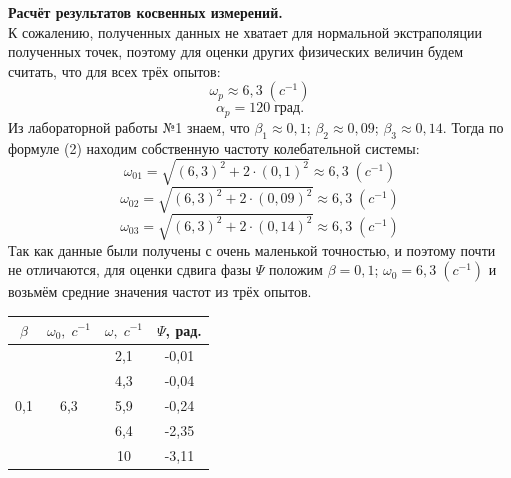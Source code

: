 \documentclass[a4paper]{article}
\begin{document}
{\parindent=0pt\textbf{Расчёт результатов косвенных измерений.}}\\
К сожалению, полученных данных не хватает для нормальной экстраполяции полученных точек, поэтому для оценки других физических величин будем считать, что для всех трёх опытов:
$$\omega_{p}\approx6,3\;(c^{-1})$$
$$\alpha_{p}=120\;\mbox{град.}$$
Из лабораторной работы №1 знаем, что $\beta_1 \approx 0,1$; $\beta_2 \approx 0,09$; $\beta_3 \approx 0,14$. Тогда по формуле (2) находим собственную частоту колебательной системы:
$$ \omega_{01}=\sqrt{(6,3)^2+2\cdot(0,1)^2}\approx6,3\;(c^{-1})$$
$$ \omega_{02}=\sqrt{(6,3)^2+2\cdot(0,09)^2}\approx6,3\;(c^{-1})$$
$$ \omega_{03}=\sqrt{(6,3)^2+2\cdot(0,14)^2}\approx6,3\;(c^{-1})$$
Так как данные были получены с очень маленькой точностью, и поэтому почти не отличаются, для оценки сдвига фазы $\Psi$ положим $\beta=0,1$; $\omega_0=6,3\;(c^{-1})$ и возьмём средние значения  частот из трёх опытов.

	\begin{center}
	\begin{tabular}{|c|c|c|c|}
	\hline
	$\beta$&$\omega_0,\;c^{-1}$&$\omega,\;c^{-1}$&$\Psi$, рад.  \\
			\hline
&  				&   2,1&-0,01\\

&  				&4,3   &-0,04\\

0,1& 6,3  &  5,9 &-0,24\\

&  				&  6,4&-2,35\\

&  				&  10 &-3,11\\
\hline
	\end{tabular}
	\end{center}

\begin{center}
\end{center}



	
\end{document}
